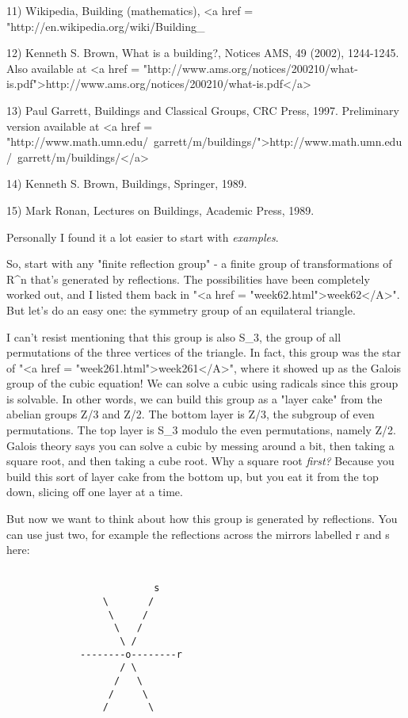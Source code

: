 11) Wikipedia, Building (mathematics),
<a href = "http://en.wikipedia.org/wiki/Building_%

12) Kenneth S. Brown, What is a building?, Notices AMS, 49 
(2002), 1244-1245.  Also available at 
<a href = "http://www.ams.org/notices/200210/what-is.pdf">http://www.ams.org/notices/200210/what-is.pdf</a>

13) Paul Garrett, Buildings and Classical Groups, CRC Press,
1997.  Preliminary version available at 
<a href = "http://www.math.umn.edu/~garrett/m/buildings/">http://www.math.umn.edu/~garrett/m/buildings/</a>

14) Kenneth S. Brown, Buildings, Springer, 1989.

15) Mark Ronan, Lectures on Buildings, Academic Press, 1989.

Personally I found it a lot easier to start with \emph{examples}.

So, start with any "finite reflection group" - a finite
group of transformations of R^{n} that's generated by reflections.  The
possibilities have been completely worked out, and I listed them back
in "<a href = "week62.html">week62</A>".  But let's do an
easy one: the symmetry group of an equilateral triangle.

I can't resist mentioning that this group is also S_{3}, the
group of all permutations of the three vertices of the triangle.  In
fact, this group was the star of "<a href =
"week261.html">week261</A>", where it showed up as the Galois
group of the cubic equation!  We can solve a cubic using radicals
since this group is solvable.  In other words, we can build this group
as a "layer cake" from the abelian groups Z/3 and Z/2.  The
bottom layer is Z/3, the subgroup of even permutations.  The top layer
is S_{3} modulo the even permutations, namely Z/2.  Galois
theory says you can solve a cubic by messing around a bit, then taking
a square root, and then taking a cube root.  Why a square root
\emph{first?}  Because you build this sort of layer cake from the bottom
up, but you eat it from the top down, slicing off one layer at a time.

But now we want to think about how this group is generated by 
reflections.  You can use just two, for example the reflections 
across the mirrors labelled r and s here:


\begin{verbatim}

                          s 
                 \       /
                  \     /
                   \   /
                    \ /
             --------o--------r
                    / \
                   /   \
                  /     \
                 /       \
\end{verbatim}
    

